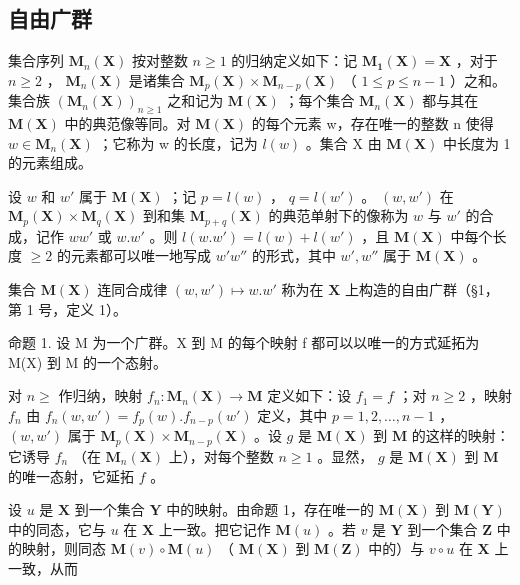 \subsection{自由广群}

集合序列 \(\mathbf{M}_{n}(\mathbf{X})\) 按对整数 \(n \geqslant 1\) 的归纳定义如下：记 \(\mathbf{M}_{\mathbf{1}}(\mathbf{X}) = \mathbf{X}\) ，对于 \(n \geqslant 2\) ， \(\mathbf{M}_{n}(\mathbf{X})\) 是诸集合 \(\mathbf{M}_{p}(\mathbf{X}) \times \mathbf{M}_{n-p}(\mathbf{X})\) （ \(1 \leqslant p \leqslant n - 1\) ）之和。集合族 \((\mathbf{M}_{n}(\mathbf{X}))_{n \geqslant 1}\) 之和记为 \(\mathbf{M}(\mathbf{X})\) ；每个集合 \(\mathbf{M}_{n}(\mathbf{X})\) 都与其在 \(\mathbf{M}(\mathbf{X})\) 中的典范像等同。对 \(\mathbf{M}(\mathbf{X})\) 的每个元素 w，存在唯一的整数 n 使得 \(w \in \mathbf{M}_{n}(\mathbf{X})\) ；它称为 w 的长度，记为 \(l(w)\) 。集合 X 由 \(\mathbf{M}(\mathbf{X})\) 中长度为 1 的元素组成。

设 \(w\) 和 \(w'\) 属于 \(\mathbf{M}(\mathbf{X})\) ；记 \(p = l(w)\) ， \(q = l(w')\) 。 \((w, w')\) 在 \(\mathbf{M}_p(\mathbf{X}) \times \mathbf{M}_q(\mathbf{X})\) 到和集 \(\mathbf{M}_{p + q}(\mathbf{X})\) 的典范单射下的像称为 \(w\) 与 \(w'\) 的合成，记作 \(ww'\) 或 \(w.w'\) 。则 \(l(w.w') = l(w) + l(w')\) ，且 \(\mathbf{M}(\mathbf{X})\) 中每个长度 \(\geqslant 2\) 的元素都可以唯一地写成 \(w'w''\) 的形式，其中 \(w', w''\) 属于 \(\mathbf{M}(\mathbf{X})\) 。

集合 \(\mathbf{M}(\mathbf{X})\) 连同合成律 \((w, w') \mapsto w.w'\) 称为在 \(\mathbf{X}\) 上构造的自由广群（§1，第 1 号，定义 1）。

命题 1. 设 M 为一个广群。X 到 M 的每个映射 f 都可以以唯一的方式延拓为 M(X) 到 M 的一个态射。

对 \(n \geqslant\) 作归纳，映射 \(f_n: \mathbf{M}_n(\mathbf{X}) \to \mathbf{M}\) 定义如下：设 \(f_{1} = f\) ；对 \(n \geqslant 2\) ，映射 \(f_{n}\) 由 \(f_{n}(w, w') = f_{p}(w).f_{n-p}(w')\) 定义，其中 \(p = 1, 2, \ldots, n - 1\) ， \((w, w')\) 属于 \(\mathbf{M}_{p}(\mathbf{X}) \times \mathbf{M}_{n-p}(\mathbf{X})\) 。设 \(g\) 是 \(\mathbf{M}(\mathbf{X})\) 到 \(\mathbf{M}\) 的这样的映射：它诱导 \(f_{n}\) （在 \(\mathbf{M}_{n}(\mathbf{X})\) 上），对每个整数 \(n \geqslant 1\) 。显然， \(g\) 是 \(\mathbf{M}(\mathbf{X})\) 到 \(\mathbf{M}\) 的唯一态射，它延拓 \(f\) 。

设 \(u\) 是 \(\mathbf{X}\) 到一个集合 \(\mathbf{Y}\) 中的映射。由命题 1，存在唯一的 \(\mathbf{M}(\mathbf{X})\) 到 \(\mathbf{M}(\mathbf{Y})\) 中的同态，它与 \(u\) 在 \(\mathbf{X}\) 上一致。把它记作 \(\mathbf{M}(u)\) 。若 \(v\) 是 \(\mathbf{Y}\) 到一个集合 \(\mathbf{Z}\) 中的映射，则同态 \(\mathbf{M}(v) \circ \mathbf{M}(u)\) （ \(\mathbf{M}(\mathbf{X})\) 到 \(\mathbf{M}(\mathbf{Z})\) 中的）与 \(v \circ u\) 在 \(\mathbf{X}\) 上一致，从而

